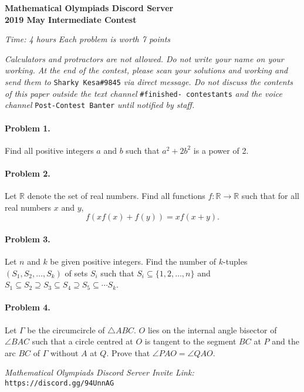 \documentclass[11pt]{article}
\begin{document}
		\noindent \Large\textbf{Mathematical Olympiads Discord Server}
		\vspace{5pt}\\
		\noindent \huge\textbf{2019 May Intermediate Contest}\\
		\noindent \makebox[\linewidth]{\rule{\textwidth}{0.4pt}}
			
	\normalsize
	
	\begin{flushright}
	\textit{Time: 4 hours} \hfill \textit{Each problem is worth 7 points}
	\end{flushright}
	
	\noindent \textit{Calculators and protractors are not allowed. Do not write your name on your working. At the end of the contest, please scan your solutions and working and send them to }\texttt{Sharky Kesa\#9845}\textit{ via direct message. Do not discuss the contents of this paper outside the text channel }\texttt{\#finished- contestants}\textit{ and the voice channel }\texttt{Post-Contest Banter}\textit{ until notified by staff. }
	
	\paragraph{Problem 1.} Find all positive integers \(a\) and \(b\) such that \(a^2  + 2b^2\) is a power of 2.
	
	\paragraph{Problem 2.} Let \(\mathbb{R}\) denote the set of real numbers. Find all functions \(f:\mathbb{R} \to \mathbb{R}\) such that for all real numbers \(x\) and \(y\), \[f(x f(x) + f(y)) = x f(x + y).\]

	\paragraph{Problem 3.}  Let \(n\) and \(k\) be given positive integers.  Find the number of \(k\)-tuples \((S_1, S_2, \dots, S_k)\) of sets \(S_i\) such that \(S_i \subseteq \{1, 2, \dots, n\}\) and \(S_1 \subseteq S_2 \supseteq S_3 \subseteq S_4 \supseteq S_5 \subseteq \cdots S_k\).

	\paragraph{Problem 4.} Let $\Gamma$ be the circumcircle of $\triangle ABC$. \(O\) lies on the internal angle bisector of \(\angle BAC\) such that a circle centred at $O$ is tangent to the segment $BC$ at $P$ and the arc $BC$ of $\Gamma$ without $A$ at $Q$. Prove that $\angle PAO = \angle QAO$.
	
	\vfill
	
	\noindent \makebox[\linewidth]{\rule{\textwidth}{0.4pt}}	
	
	\noindent \textit{Mathematical Olympiads Discord Server Invite Link:} \texttt{https://discord.gg/94UnnAG}
		
		
		
		
	
	
\end{document}

